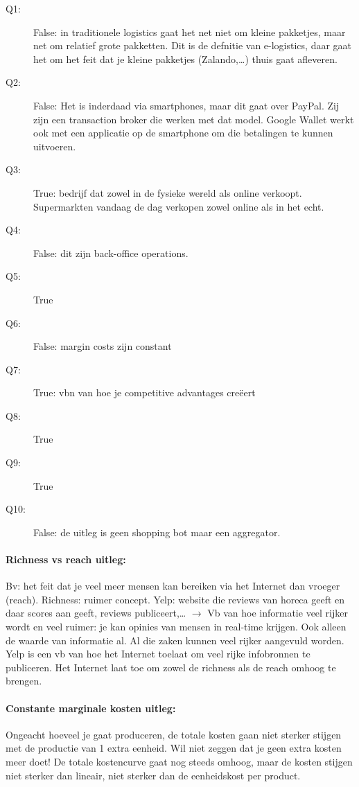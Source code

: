 \documentclass[10pt,a4paper]{report}
\begin{document}
\begin{description}
\item[Q1:]False: in traditionele logistics gaat het net niet om kleine pakketjes, maar net om relatief grote pakketten. Dit is de defnitie van e-logistics, daar gaat het om het feit dat je kleine pakketjes (Zalando,…) thuis gaat afleveren.
\item[Q2:]False: Het is inderdaad via smartphones, maar dit gaat over PayPal. Zij zijn een transaction broker die werken met dat model. Google Wallet werkt ook met een applicatie op de smartphone om die betalingen te kunnen uitvoeren.
\item[Q3:]True: bedrijf dat zowel in de fysieke wereld als online verkoopt. Supermarkten vandaag de dag verkopen zowel online als in het echt. 
\item[Q4:]False: dit zijn back-office operations.
\item[Q5:]True
\item[Q6:]False: margin costs zijn constant
\item[Q7:]True: vbn van hoe je competitive advantages creëert
\item[Q8:]True
\item[Q9:]True
\item[Q10:]False: de uitleg is geen shopping bot maar een aggregator.
\end{description}

\paragraph{Richness vs reach uitleg:}Bv: het feit dat je veel meer mensen kan bereiken via het Internet dan vroeger (reach). Richness: ruimer concept. Yelp: website die reviews van horeca geeft en daar scores aan geeft, reviews publiceert,… $\rightarrow$ Vb van hoe informatie veel rijker wordt en veel ruimer: je kan opinies van mensen in real-time krijgen. Ook alleen de waarde van informatie al. Al die zaken kunnen veel rijker aangevuld worden. Yelp is een vb van hoe het Internet toelaat om veel rijke infobronnen te publiceren. Het Internet laat toe om zowel de richness als de reach omhoog te brengen.

\paragraph{Constante marginale kosten uitleg:}Ongeacht hoeveel je gaat produceren, de totale kosten gaan niet sterker stijgen met de productie van 1 extra eenheid. Wil niet zeggen dat je geen extra kosten meer doet! De totale kostencurve gaat nog steeds omhoog, maar de kosten stijgen niet sterker dan lineair, niet sterker dan de eenheidskost per product. \\
\end{document}
